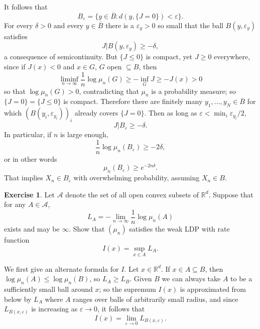 \documentclass[10pt]{article}
\newcommand{\RR}{\mathbb{R}}
\theoremstyle{definition}
\newtheorem{exer}{Exercise}
\begin{document}
It follows that
$$B_\varepsilon = \{y \in \overline B: d(y, \{J = 0\}) < \varepsilon\}.$$
For every $\delta > 0$ and every $y \in \overline B$ there is a $\varepsilon_y > 0$ so small that the ball $B(y, \varepsilon_y)$ satisfies
$$J|B(y, \varepsilon_y) \geq -\delta,$$
a consequence of semicontinuity.
But $\{J \leq 0\}$ is compact, yet $J \geq 0$ everywhere, since if $J(x) < 0$ and $x \in G$, $G$ open $\subseteq B$, then
$$\liminf_{n \to \infty} \frac{1}{n} \log \mu_n(G) \geq -\inf_G J \geq -J(x) > 0$$
so that $\log \mu_n(G) > 0$, contradicting that $\mu_n$ is a probability measure; so $\{J = 0\} = \{J \leq 0\}$ is compact.
Therefore there are finitely many $y_1, \dots, y_N \in \overline B$ for which $(B(y_i, \varepsilon_{y_i}))_i$ already covers $\{J = 0\}$.
Then as long as $\varepsilon < \min_i \varepsilon_{y_i}/2$,
$$J|B_\varepsilon \geq -\delta.$$
In particular, if $n$ is large enough,
$$\frac{1}{n} \log \mu_n(B_\varepsilon) \geq -2\delta,$$
or in other words
$$\mu_n(B_\varepsilon) \geq e^{-2n\delta}.$$
That implies $X_n \in B_\varepsilon$ with overwhelming probability, assuming $X_n \in B$.

\begin{exer}
Let $\mathcal A$ denote the set of all open convex subsets of $\RR^d$.
Suppose that for any $A \in \mathcal A$,
$$L_A = -\lim_{n \to \infty} \frac{1}{n} \log \mu_n(A)$$
exists and may be $\infty$. Show that $(\mu_n)$ satisfies the weak LDP with rate function
$$I(x) = \sup_{x \in A} L_A.$$
\end{exer}

We first give an alternate formula for $I$.
Let $x \in \RR^d$. If $x \in A \subseteq B$, then $\log \mu_n(A) \leq \log \mu_n(B)$, so $L_A \geq L_B$.
Given $B$ we can always take $A$ to be a sufficiently small ball around $x$; so the supremum $I(x)$ is approximated from below by $L_A$ where $A$ ranges over balls of arbitrarily small radius, and since $L_{B(x, \varepsilon)}$ is increasing as $\varepsilon \to 0$, it follows that
$$I(x) = \lim_{\varepsilon \to 0} L_{B(x, \varepsilon)}.$$
\end{document}
